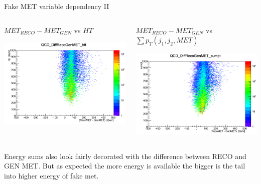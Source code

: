 \documentclass[8pt]{beamer}
\begin{document}
\begin{frame}{Fake MET variable dependency II}
 
\begin{columns}

\begin{block}{$MET_{RECO}-MET_{GEN}$ vs $HT$}

\centering
\includegraphics[width=\linewidth]{img/QCD_DiffRecoGenMET_htt.png} 
 
\end{block}

\begin{block}{$MET_{RECO}-MET_{GEN}$ vs $\sum p_T(j_1,j_2,MET)$}

\centering
\includegraphics[width=\linewidth]{img/QCD_DiffRecoGenMET_sumpt.png} 
 
\end{block}

\end{columns}

Energy sums also look fairly decorated with the difference between RECO and GEN MET. But as expected the more energy
is available the bigger is the tail into higher energy of fake met.

\end{frame}
\end{document}
